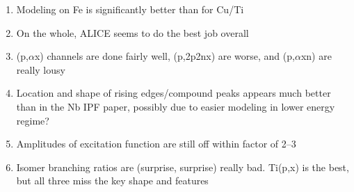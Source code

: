 \begin{enumerate}
 \item Modeling on Fe is significantly better than for Cu/Ti
 \item On the whole, ALICE seems to do the best job overall
 \item (p,$\alpha$x) channels are done fairly well, (p,2p2nx) are worse, and (p,$\alpha$xn) are really lousy
 \item Location and shape of rising edges/compound peaks appears much better than in the Nb IPF paper, possibly due to easier modeling in lower energy regime?
 \item Amplitudes of excitation function are still off within factor of 2--3
 \item Isomer branching ratios are (surprise, surprise) really bad.  Ti(p,x) is the best, but all three miss the key shape and features
\end{enumerate}



